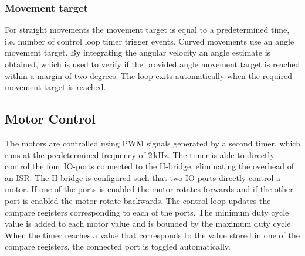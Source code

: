\subsubsection{Movement target}

For straight movements the movement target is equal to a predetermined time, i.e. number of control loop timer trigger events.
Curved movements use an angle movement target.
By integrating the angular velocity an angle estimate is obtained, which is used to verify if the provided angle movement target is reached within a margin of two degrees.
The loop exits automatically when the required movement target is reached.

\subsection{Motor Control}
The motors are controlled using PWM signals generated by a second timer, which runs at the predetermined frequency of 2\,kHz.
The timer is able to directly control the four IO-ports connected to the H-bridge, eliminating the overhead of an ISR.
The H-bridge is configured such that two IO-ports directly control a motor.
If one of the ports is enabled the motor rotates forwards and if the other port is enabled the motor rotate backwards.
The control loop updates the compare registers corresponding to each of the ports.
The minimum duty cycle value is added to each motor value and is bounded by the maximum duty cycle.
When the timer reaches a value that corresponds to the value stored in one of the compare registers, the connected port is toggled automatically.



